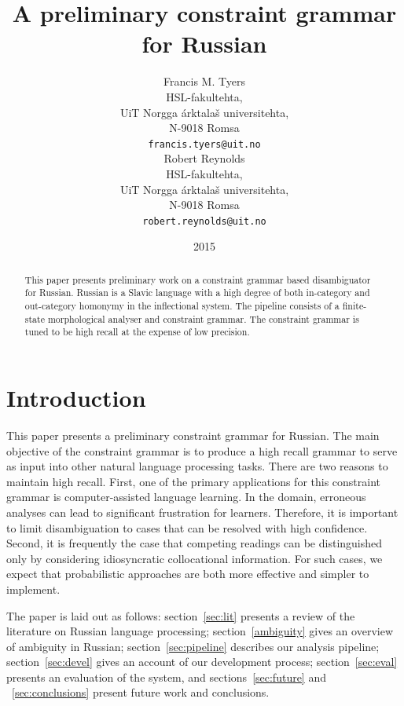 \documentclass[11pt]{article}
\title{A preliminary constraint grammar for Russian}
\author{Francis M. Tyers \\
  HSL-fakultehta, \\
  UiT Norgga árktalaš universitehta, \\
  N-9018 Romsa \\
  {\tt francis.tyers@uit.no} \\\And
  Robert Reynolds \\
  HSL-fakultehta, \\
  UiT Norgga árktalaš universitehta, \\
  N-9018 Romsa \\
  {\tt robert.reynolds@uit.no} \\}
\date{2015}
\newcommand{\rr}[1]{\marginpar{\scriptsize R: #1}} %
\begin{document}
\maketitle
\begin{abstract}
 This paper presents preliminary work on a constraint
 grammar based disambiguator for Russian. Russian is
 a Slavic language with a high degree of both in-category
 and out-category homonymy in the inflectional system.
 The pipeline consists of a finite-state morphological
 analyser and constraint grammar. The constraint 
 grammar is tuned to be high recall at the expense of 
 low precision.
 \rr{add results to abstract}
\end{abstract}

\section{Introduction}

This paper presents a preliminary constraint grammar for Russian. The main 
objective of the constraint grammar is to produce a high recall grammar to serve
as input into other natural language processing tasks. There are two reasons to
maintain high recall. First, one of the primary applications for this constraint grammar
is computer-assisted language learning. In the domain, erroneous analyses can lead to
significant frustration for learners. Therefore, it is important to limit disambiguation
to cases that can be resolved with high confidence.
Second, it is frequently the case that competing readings can
be distinguished only by considering idiosyncratic collocational information. For such cases, 
we expect that probabilistic approaches are both more effective and simpler to implement.

The paper is laid out as follows: section~\ref{sec:lit} presents a review of 
the literature on Russian language processing; section~\ref{ambiguity} gives
an overview of ambiguity in Russian; section~\ref{sec:pipeline} describes
our analysis pipeline; section~\ref{sec:devel} gives an account of our 
development process; section~\ref{sec:eval} presents an evaluation of the 
system, and sections~\ref{sec:future} and ~\ref{sec:conclusions} present future
work and conclusions.



\end{document}
